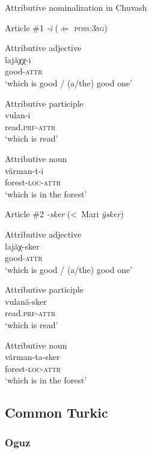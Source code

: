 \begin{exe}
\ex 
\rm{Attributive nominalization in Chuvash \citep{krueger1961}}
\begin{xlist}
\ex 
\rm{Article \#1 \textit{-i} ($\Leftarrow$ \textsc{poss:3sg})}
\begin{xlist}
\ex	
\rm{Attributive adjective}\\
\gll	lajăχχ-i\\
	good-\textsc{attr}\\
\glt	‘which is good / (a/the) good one’

\ex	
\rm{Attributive participle}\\
\gll	vulan-i\\
	read.\textsc{prf}-\textsc{attr}\\
\glt	‘which is read’

\ex	
\rm{Attributive noun}\\
\gll	vărman-t-i\\
	forest-\textsc{loc}-\textsc{attr}\\
\glt	‘which is in the forest’
\end{xlist}

\ex 
\rm{Article \#2 \textit{-sker} (<~Mari \textit{ÿsker})}
\begin{xlist}
\ex	
\rm{Attributive adjective}\\
\gll	lajăχ-sker\\
	good-\textsc{attr}\\
\glt	‘which is good / (a/the) good one’

\ex	
\rm{Attributive participle}\\
\gll	vulană-sker\\
	read.\textsc{prf}-\textsc{attr}\\
\glt	‘which is read’

\ex	
\rm{Attributive noun}\\
\gll	vărman-ta-sker\\
	forest-\textsc{loc}-\textsc{attr}\\
\glt	‘which is in the forest’
\end{xlist}
\end{xlist}
\end{exe}

\subsection{Common Turkic}
\subsubsection{Oguz}
